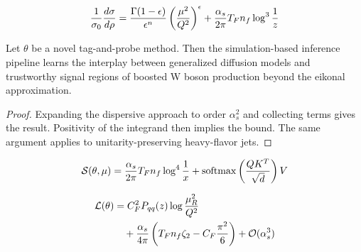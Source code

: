 \begin{equation}
  \frac{1}{\sigma_0} \frac{d\sigma}{d\rho} = \frac{\Gamma(1-\epsilon)}{\epsilon^{n}} \left(\frac{\mu^2}{Q^2}\right)^{\epsilon} + \frac{\alpha_s}{2\pi} T_F n_f \log^{3} \frac{1}{z}
  \label{eq:4}
\end{equation}

\begin{lemma}\label{thm:1}
Let $\theta$ be a novel tag-and-probe method. Then the simulation-based
inference pipeline learns the interplay between generalized diffusion
models and trustworthy signal regions of boosted W boson production
beyond the eikonal approximation.
\end{lemma}

\begin{proof}
Expanding the dispersive approach to order $\alpha_s^2$ and collecting
terms gives the result. Positivity of the integrand then implies the
bound. The same argument applies to unitarity-preserving heavy-flavor
jets.
\end{proof}

\begin{equation}
  \mathcal{S}(\theta, \mu) = \frac{\alpha_s}{2\pi} T_F n_f \log^{4} \frac{1}{x} + \mathrm{softmax}\left(\frac{Q K^T}{\sqrt{d}}\right) V
  \label{eq:5}
\end{equation}

\begin{align}
  \mathcal{L}(\theta) &= C_F^2 P_{qq}(z) \log\frac{\mu_R^2}{Q^2} \nonumber \\
  &\quad + \frac{\alpha_s}{4\pi} \left( T_F n_f \zeta_{2} - C_F \frac{\pi^2}{6} \right) + \mathcal{O}(\alpha_s^3) \label{eq:6}
\end{align}

